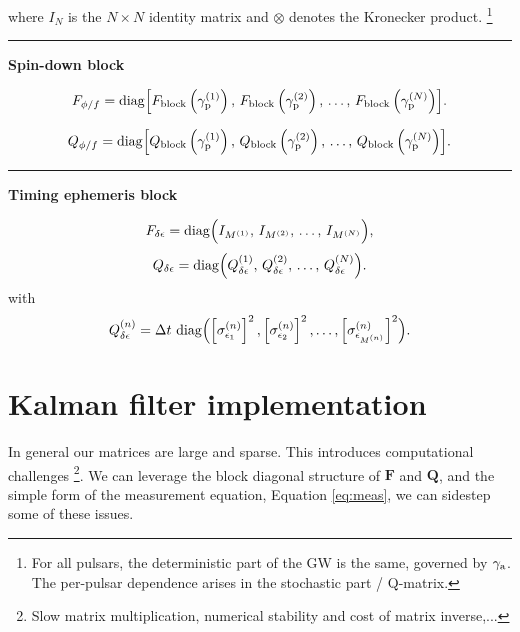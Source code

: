 \documentclass{tufte-handout} %
\begin{document}
where $I_N$ is the $N\times N$ identity matrix and $\otimes$ denotes the Kronecker product. \footnote{For all pulsars, the deterministic part of the GW is the same, governed by $\gamma_{\rm a}$. The per-pulsar dependence arises in the stochastic part / Q-matrix.}

\hrule \vspace{2mm}

\noindent \textbf{Spin-down block}

\begin{equation}
	F_{\phi/f} = \operatorname{diag}\Bigl[ F_{\rm block} \left(\gamma_{\rm p}^{(1)} \right),\,F_{\rm block} \left(\gamma_{\rm p}^{(2)} \right),\,\ldots,\,F_{\rm block} \left(\gamma_{\rm p}^{(N)} \right)\Bigr].
\end{equation}

\begin{equation}
Q_{\phi/f} = \operatorname{diag}\Bigl[ Q_{\rm block} \left(\gamma_{\rm p}^{(1)} \right),\,Q_{\rm block} \left(\gamma_{\rm p}^{(2)} \right),\,\ldots,\,Q_{\rm block} \left(\gamma_{\rm p}^{(N)} \right)\Bigr].
\end{equation}


\hrule \vspace{2mm}

\noindent \textbf{Timing ephemeris block}


    \begin{equation}
	F_{\delta\epsilon} = \operatorname{diag}\Bigl(I_{M^{(1)}},\,I_{M^{(2)}},\,\dots,\,I_{M^{(N)}}\Bigr),
\end{equation}
\begin{equation}
	Q_{\delta\epsilon}  = \operatorname{diag}\Bigl(Q^{(1)}_{\delta\epsilon},\,Q^{(2)}_{\delta\epsilon},\,\dots,\,Q^{(N)}_{\delta\epsilon}\Bigr).
\end{equation}
with
\begin{equation}
	Q^{(n)}_{\delta\epsilon} =  \Delta t\,\operatorname{diag}\Bigl(\left[\sigma_{\epsilon_1}^{(n)}\right]^2,\left[\sigma_{\epsilon_2}^{(n)}\right]^2,\dots,\left[\sigma_{\epsilon_{M^{(n)}}}^{(n)}\right]^2\Bigr).
\end{equation}



\section{Kalman filter implementation}
In general our matrices are large and sparse. This introduces computational challenges \footnote{Slow matrix multiplication, numerical stability and cost of matrix inverse,...}. We can leverage the block diagonal structure of $\mathbf{F}$ and $\mathbf{Q}$, and the simple form of the measurement equation, Equation \eqref{eq:meas}, we can sidestep some of these issues. \newline 
\end{document}
